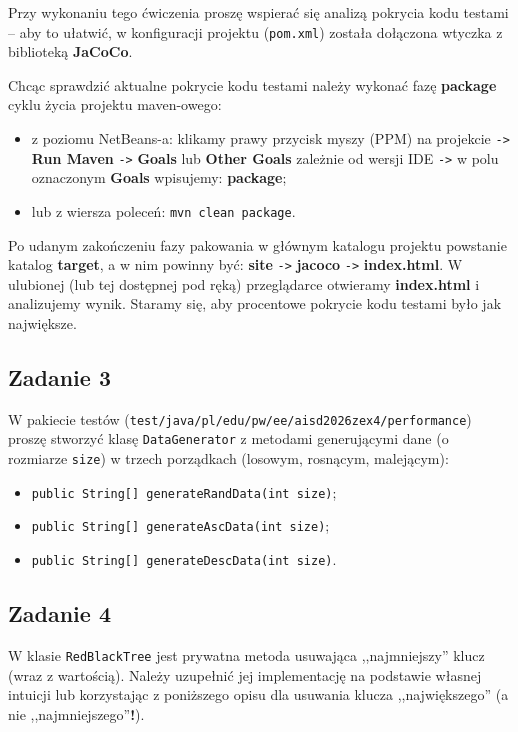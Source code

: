\documentclass[twoside]{article}
\begin{document}
Przy wykonaniu tego ćwiczenia proszę wspierać się analizą pokrycia kodu testami -- aby to ułatwić,
w konfiguracji projektu (\verb|pom.xml|) została dołączona wtyczka z biblioteką \textbf{JaCoCo}.

Chcąc sprawdzić aktualne pokrycie kodu testami należy wykonać fazę \textbf{package} cyklu życia projektu maven-owego:
\begin{itemize}
    \item z poziomu NetBeans-a: klikamy prawy przycisk myszy (PPM) na projekcie 
    \verb|->| \textbf{Run Maven}
    \verb|->| \textbf{Goals} lub \textbf{Other Goals} zależnie od wersji IDE
    \verb|->| w polu oznaczonym \textbf{Goals} wpisujemy: \textbf{package};
    \item lub z wiersza poleceń: \verb|mvn clean package|.
\end{itemize}

Po udanym zakończeniu fazy pakowania w głównym katalogu projektu powstanie katalog \textbf{target},
a w nim powinny być: \textbf{site} \verb|->| \textbf{jacoco} \verb|->| \textbf{index.html}.
W ulubionej (lub tej dostępnej pod ręką) przeglądarce otwieramy \textbf{index.html} i analizujemy
wynik. Staramy się, aby procentowe pokrycie kodu testami było jak największe.


\subsection{Zadanie 3}
W pakiecie testów (\verb|test/|\verb|java/|\verb|pl/|\verb|edu/|\verb|pw/|\verb|ee/|\verb|aisd2026zex4/|\verb|performance|) proszę stworzyć klasę \verb|DataGenerator| z metodami
generującymi dane (o rozmiarze \verb|size|) w trzech porządkach (losowym, rosnącym, malejącym):
\begin{itemize}
    \item \verb|public String[] generateRandData(int size)|;
    \item \verb|public String[] generateAscData(int size)|;
    \item \verb|public String[] generateDescData(int size)|.
\end{itemize}


\subsection{Zadanie 4}
W klasie \verb|RedBlackTree| jest prywatna metoda usuwająca ,,najmniejszy'' klucz (wraz z wartością).
Należy uzupełnić jej implementację na podstawie własnej intuicji lub korzystając z poniższego opisu dla usuwania klucza ,,największego'' (a nie ,,najmniejszego''\textbf{!}).
\end{document}
